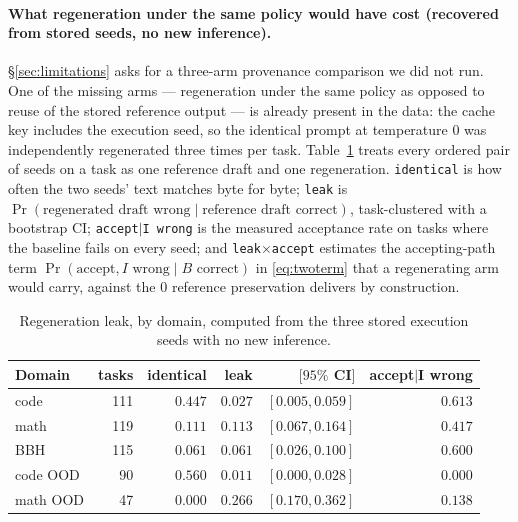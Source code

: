 \documentclass{article}
\begin{document}
\paragraph{What regeneration under the same policy would have cost (recovered
from stored seeds, no new inference).} \S\ref{sec:limitations} asks for a
three-arm provenance comparison we did not run. One of the missing arms ---
regeneration under the same policy as opposed to reuse of the stored reference
output --- is already present in the data: the cache key includes the
execution seed, so the identical prompt at temperature $0$ was independently
regenerated three times per task. Table~\ref{tab:regenleak} treats every
ordered pair of seeds on a task as one reference draft and one regeneration.
\texttt{identical} is how often the two seeds' text matches byte for byte;
\texttt{leak} is $\Pr(\text{regenerated draft wrong} \mid \text{reference draft
correct})$, task-clustered with a bootstrap CI; \texttt{accept$\mid$I wrong} is
the measured acceptance rate on tasks where the baseline fails on every seed;
and \texttt{leak}$\times$\texttt{accept} estimates the accepting-path term
$\Pr(\text{accept}, I\text{ wrong} \mid B\text{ correct})$ in \eqref{eq:twoterm}
that a regenerating arm would carry, against the $0$ reference preservation
delivers by construction.

\begin{table}[h]
\centering
\small
\caption{Regeneration leak, by domain, computed from the three stored execution
seeds with no new inference.}
\label{tab:regenleak}
\begin{tabular}{lrrrrr}
\toprule
Domain & tasks & identical & leak & $[95\%$ CI$]$ & accept$\mid$I wrong \\
\midrule
code      & 111 & $0.447$ & $0.027$ & $[0.005, 0.059]$ & $0.613$ \\
math      & 119 & $0.111$ & $0.113$ & $[0.067, 0.164]$ & $0.417$ \\
BBH       & 115 & $0.061$ & $0.061$ & $[0.026, 0.100]$ & $0.600$ \\
code OOD  &  90 & $0.560$ & $0.011$ & $[0.000, 0.028]$ & $0.000$ \\
math OOD  &  47 & $0.000$ & $0.266$ & $[0.170, 0.362]$ & $0.138$ \\
\bottomrule
\end{tabular}
\end{table}
\end{document}
